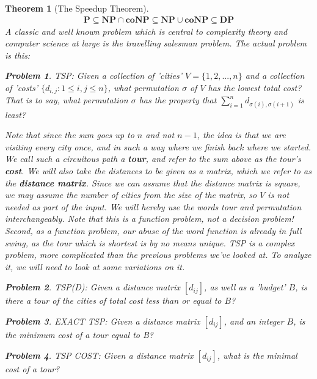 \documentclass{article}
\theoremstyle{definition}
\newtheorem{problem}{Problem}
\theoremstyle{plain}
\theoremstyle{theorem}
\newtheorem{theorem}{Theorem}[section]
\begin{document}
\begin{theorem}[The Speedup Theorem]
\begin{align}
    \textbf{P} \subseteq \textbf{NP} \cap \textbf{coNP} \subseteq \textbf{NP} \cup \textbf{coNP} \subseteq \textbf{DP}
\end{align}
A classic and well known problem which is central to complexity theory and computer science at large is the \textit{travelling salesman problem}. The actual problem is this:
\begin{problem}
    TSP: Given a collection of 'cities' $V=\{1,2,...,n\}$ and a collection of 'costs' $\{d_{i,j}:1 \leq i,j \leq n\}$, what permutation $\sigma$ of $V$ has the lowest total cost? That is to say, what permutation $\sigma$ has the property that $\sum_{i=1}^{n} d_{\sigma(i),\sigma(i+1)}$ is least?
\end{problem}
Note that since the sum goes up to $n$ and not $n-1$, the idea is that we are visiting every city once, and in such a way where we finish back where we started. We call such a circuitous path a \textbf{tour}, and refer to the sum above as the tour's \textbf{cost}. We will also take the distances to be given as a matrix, which we refer to as the \textbf{distance matrix}. Since we can assume that the distance matrix is square, we may assume the number of cities from the size of the matrix, so $V$ is not needed as part of the input. We will hereby use the words tour and permutation interchangeably. Note that this is a function problem, not a decision problem! Second, as a function problem, our abuse of the word function is already in full swing, as the tour which is shortest is by no means unique.
TSP is a complex problem, more complicated than the previous problems we've looked at. To analyze it, we will need to look at some variations on it.
\begin{problem} 
    TSP(D): Given a distance matrix $[d_{ij}]$, as well as a 'budget' $B$, is there a tour of the cities of total cost less than or equal to $B$?
\end{problem}
\begin{problem}
    EXACT TSP: Given a distance matrix $[d_{ij}]$, and an integer $B$, is the minimum cost of a tour \textit{equal} to B?
\end{problem}
\begin{problem}
    TSP COST: Given a distance matrix $[d_{ij}]$, what is the minimal cost of a tour?
\end{problem}

\end{theorem}
\end{document}
